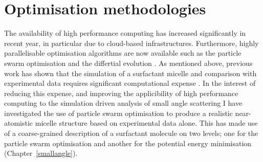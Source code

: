 \section{Optimisation methodologies}

The availability of high performance computing has increased significantly in recent year, in particular due to cloud-based infrastructures.
Furthermore, highly parallelisable optimisation algorithms are now available such as the particle swarm optimisation \cite{kennedy_particle_1995,shi_modified_1998} and the differtial evolution \cite{storn_differential_1997}.
As mentioned above, previous work has shown that the simulation of a surfactant micelle and comparison with experimental data requires significant computational expense \cite{hargreaves_atomistic_2011,ivanovic_temperature-dependent_2018}.
In the interest of reducing this expense, and improving the applicibility of high performance computing to the simulation driven analysis of small angle scattering I have investigated the use of particle swarm optimisation to produce a realistic near-atomistic micelle structure based on experimental data alone.
This has made use of a coarse-grained description of a surfactant molecule on two levels; one for the particle swarm optimisation and another for the potential energy minimisation (Chapter~\ref{smallangle}).
